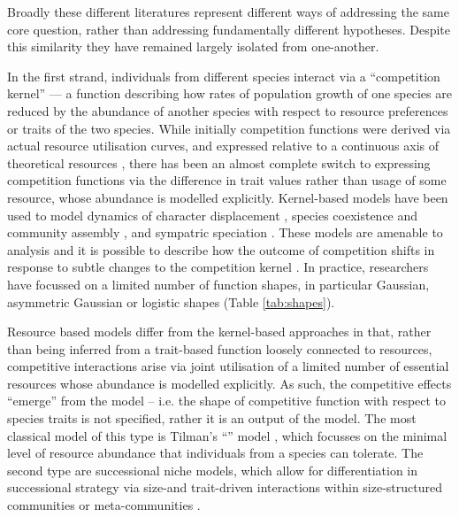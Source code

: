 \documentclass[a4paper,11pt]{article}
\begin{document}
Broadly these different literatures represent different ways of
addressing the same core question, rather than addressing fundamentally
different hypotheses.  Despite this similarity they have remained
largely isolated from one-another.

In the first strand, individuals from different species interact via a
``competition kernel'' --- a function describing how rates of
population growth of one species are reduced by the abundance of
another species with respect to resource preferences or traits of the
two species.
%
While initially competition functions were derived via actual resource
utilisation curves, and expressed relative to a continuous axis of theoretical resources
\citep{MacArthur-1967, Roughgarden-1979}, there has been an almost
complete switch to expressing competition functions via the
difference in trait values rather than usage of some resource, whose
abundance is modelled explicitly.
%
Kernel-based models have been used to model dynamics of
character displacement \citep{Taper-1985, Case-2000}, species
coexistence and community assembly \citep{MacArthur-1967,
  Calcagno-2006, Leimar-2013}, and sympatric speciation
\citep{Dieckmann-1999}.
%
These models are amenable to analysis and it is possible to describe how
the outcome of competition shifts in response to subtle changes to the competition
kernel \citep{Calcagno-2006, Scheffer-2006, Pigolotti-2007,
  Leimar-2013}.
%
In practice, researchers have focussed on a limited number of function
shapes, in particular Gaussian, asymmetric Gaussian or logistic shapes
(Table \ref{tab:shapes}).

Resource based models differ from the kernel-based approaches in that,
rather than being inferred from a trait-based function loosely connected to resources, competitive
interactions arise via joint utilisation of
a limited number of essential resources whose abundance is modelled
explicitly.  As such, the competitive effects ``emerge'' from the
model -- i.e. the shape of competitive function with respect to
species traits is not specified, rather it is an output of the model.
%
The most classical model of this type is Tilman's ``\Rstar'' model \citep{Tilman-1977,
  Tilman-1982}, which focusses on the minimal level of resource
abundance that individuals from a species can tolerate.
The second type are successional niche models, which allow for
differentiation in successional strategy via size-and
trait-driven interactions within size-structured communities or
meta-communities
\citep{Huston-1987,Kohyama-1993,Moorcroft-2001,Falster-2011}.
\end{document}
